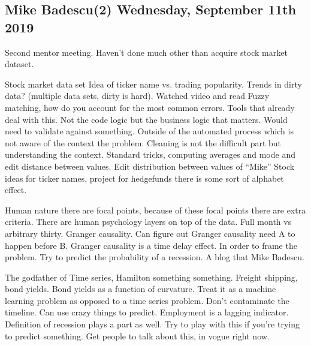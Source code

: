 \subsection{Mike Badescu(2) Wednesday, September 11th 2019}

Second mentor meeting. Haven't done much other than
acquire stock market dataset.

Stock market data set
Idea of ticker name vs. trading popularity.
Trends in dirty data? (multiple data sets, dirty is hard).
Watched video and read
Fuzzy matching, how do you account for the most
common errors. Tools that already deal with this.
Not the code logic but the business logic that matters.
Would need to validate against something. Outside of
the automated process which is not aware of the context
the problem. Cleaning is not the difficult part but
understanding the context. Standard tricks, computing
averages and mode and edit distance between values.
Edit distribution between values of ``Mike''
Stock ideas for ticker names, project for hedgefunds
there is some sort of alphabet effect.

Human nature there are focal points, because of these
focal points there are extra criteria. There are human psychology
layers on top of the data. Full month vs arbitrary thirty.
Granger causality. Can figure out Granger causality
need A to happen before B. Granger causality is a time
delay effect. In order to frame the problem. Try to
predict the probability of a recession. A blog
that Mike Badescu.

The godfather of Time series, Hamilton something something. Freight shipping, bond yields.
Bond yields as a function of curvature.
Treat it as a machine learning problem as opposed to a time
series problem. Don't contaminate the timeline. Can use crazy
things to predict. Employment is a lagging indicator.
Definition of recession plays a part as well.
Try to play with this if you're trying to predict something.
Get people to talk about this, in vogue right now.

